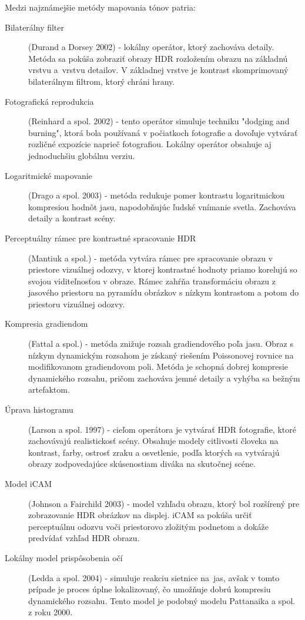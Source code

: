 Medzi najznámejšie metódy mapovania tónov patria:
\begin{description}
    \item [Bilaterálny filter]
    (Durand a Dorsey 2002) - lokálny operátor, ktorý zachováva detaily. Metóda sa pokúša zobraziť obrazy HDR
    rozložením obrazu na základnú vrstvu a~vrstvu detailov. V základnej vrstve je kontrast skomprimovaný
    bilaterálnym filtrom, ktorý chráni hrany. \cite{TMODurand}

    \item [Fotografická reprodukcia]
    (Reinhard a spol. 2002) - tento operátor simuluje techniku "dodging and burning", ktorá bola používaná
    v počiatkoch fotografie a dovoľuje vytvárať rozličné expozície naprieč fotografiou. Lokálny operátor
    obsahuje aj jednoduchšiu globálnu verziu. \cite{TMOReinhard}
    
    \item [Logaritmické mapovanie]
    (Drago a spol. 2003) - metóda redukuje pomer kontrastu logaritmickou kompresiou hodnôt jasu,
    napodobňujúc ľudské vnímanie svetla. Zachováva detaily a kontrast scény. \cite{TMODrago}

    \item [Perceptuálny rámec pre kontrastné spracovanie HDR]
    (Mantiuk a spol.) - metóda vytvára rámec pre spracovanie obrazu v priestore vizuálnej odozvy, v ktorej
    kontrastné hodnoty priamo korelujú so svojou viditeľnosťou v obraze. Rámec zahŕňa transformáciu obrazu
    z jasového priestoru na pyramídu obrázkov s nízkym kontrastom a potom do priestoru vizuálnej
    odozvy. \cite{TMOMantiuk}

    \item [Kompresia gradiendom]
    (Fattal a spol.) - metóda znižuje rozsah gradiendového poľa jasu. Obraz s nízkym dynamickým rozsahom
    je získaný riešením Poissonovej rovnice na modifikovanom gradiendovom poli. Metóda je schopná dobrej
    kompresie dynamického rozsahu, pričom zachováva jemné detaily a vyhýba sa bežným artefaktom. \cite{TMOFattal}

    \item [Úprava histogramu] (Larson a spol. 1997) - cieľom operátora je vytvárať HDR fotografie, ktoré
    zachovávajú realistickosť scény. Obsahuje modely citlivosti človeka na kontrast, farby, ostrosť zraku
    a osvetlenie, podľa ktorých sa vytvárajú obrazy zodpovedajúce skúsenostiam diváka na skutočnej scéne.
    \cite{AHDR}

    \item [Model iCAM]
    (Johnson a Fairchild 2003) - model vzhľadu obrazu, ktorý bol rozšírený pre zobrazovanie HDR obrázkov
    na displej. iCAM sa pokúša určiť perceptuálnu odozvu voči priestorovo zložitým podnetom a dokáže predvídať
    vzhľad HDR obrazu. \cite{TMOFairchild}
    
    \item [Lokálny model prispôsobenia očí]
    (Ledda a spol. 2004) - simuluje reakciu sietnice na~jas, avšak v tomto prípade je proces úplne lokalizovaný,
    čo umožňuje dobrú kompresiu dynamického rozsahu. Tento model je podobný modelu Pattanaika a spol. z roku 2000.
    \cite{TMOLedda}
\end{description}
